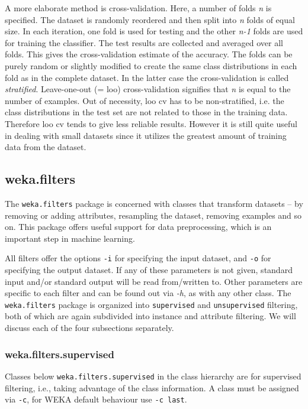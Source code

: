 A more elaborate method is cross-validation. Here, a number of folds \textit{n} is specified. The dataset is randomly reordered and then split into \textit{n} folds of equal size. In each iteration, one fold is used for testing and the other \textit{n-1} folds are used for training the classifier. The test results are collected and averaged over all folds. This gives the cross-validation estimate of the accuracy. The folds can be purely random or slightly modified to create the same class distributions in each fold as in the complete dataset. In the latter case the cross-validation is called \textit{stratified}. Leave-one-out (= loo) cross-validation signifies that \textit{n} is equal to the number of examples. Out of necessity, loo cv has to be non-stratified, i.e. the class distributions in the test set are not related to those in the training data. Therefore loo cv tends to give less reliable results. However it is still quite useful in dealing with small datasets since it utilizes the greatest amount of training data from the dataset.

\newpage
\subsection{weka.filters}

The \texttt{weka.filters} package is concerned with classes that transform datasets -- by removing or adding attributes, resampling the dataset, removing examples and so on. This package offers useful support for data preprocessing, which is an important step in machine learning.

All filters offer the options \texttt{-i} for specifying the input dataset, and \texttt{-o} for specifying the output dataset. If any of these parameters is not given, standard input and/or standard output will be read from/written to. Other parameters are specific to each filter and can be found out via \textit{-h}, as with any other class. The \texttt{weka.filters} package is organized into \texttt{supervised} and \texttt{unsupervised} filtering, both of which are again subdivided into instance and attribute filtering. We will discuss each of the four subsections separately.

\subsubsection*{weka.filters.supervised}

Classes below \texttt{weka.filters.supervised} in the class hierarchy are for supervised filtering, i.e., taking advantage of the class information. A class must be assigned via \texttt{-c}, for WEKA default behaviour use \texttt{-c last}.

